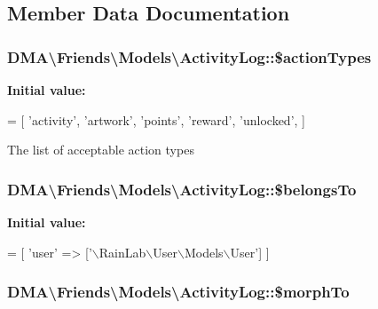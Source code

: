 \subsection{Member Data Documentation}
\hypertarget{classDMA_1_1Friends_1_1Models_1_1ActivityLog_aa60b5fe0e1e7c254827bfa35c69aef9d}{
\subsubsection[{\$action\-Types}]{\setlength{\rightskip}{0pt plus 5cm}D\-M\-A\textbackslash{}\-Friends\textbackslash{}\-Models\textbackslash{}\-Activity\-Log\-::\$action\-Types}}\label{classDMA_1_1Friends_1_1Models_1_1ActivityLog_aa60b5fe0e1e7c254827bfa35c69aef9d}
{\bfseries Initial value\-:}
\begin{DoxyCode}
= [
        \textcolor{stringliteral}{'activity'},
        \textcolor{stringliteral}{'artwork'},
        \textcolor{stringliteral}{'points'},
        \textcolor{stringliteral}{'reward'},
        \textcolor{stringliteral}{'unlocked'},
    ]
\end{DoxyCode}
The list of acceptable action types \hypertarget{classDMA_1_1Friends_1_1Models_1_1ActivityLog_aff637d41ffa73260e1ffc1788f5a98d7}{
\subsubsection[{\$belongs\-To}]{\setlength{\rightskip}{0pt plus 5cm}D\-M\-A\textbackslash{}\-Friends\textbackslash{}\-Models\textbackslash{}\-Activity\-Log\-::\$belongs\-To}}\label{classDMA_1_1Friends_1_1Models_1_1ActivityLog_aff637d41ffa73260e1ffc1788f5a98d7}
{\bfseries Initial value\-:}
\begin{DoxyCode}
= [
        \textcolor{stringliteral}{'user'} => [\textcolor{stringliteral}{'\(\backslash\)RainLab\(\backslash\)User\(\backslash\)Models\(\backslash\)User'}]
    ]
\end{DoxyCode}
\hypertarget{classDMA_1_1Friends_1_1Models_1_1ActivityLog_afaa82849e3e93bf41ac948658ac652ff}{
\subsubsection[{\$morph\-To}]{\setlength{\rightskip}{0pt plus 5cm}D\-M\-A\textbackslash{}\-Friends\textbackslash{}\-Models\textbackslash{}\-Activity\-Log\-::\$morph\-To}}\label{classDMA_1_1Friends_1_1Models_1_1ActivityLog_afaa82849e3e93bf41ac948658ac652ff}
